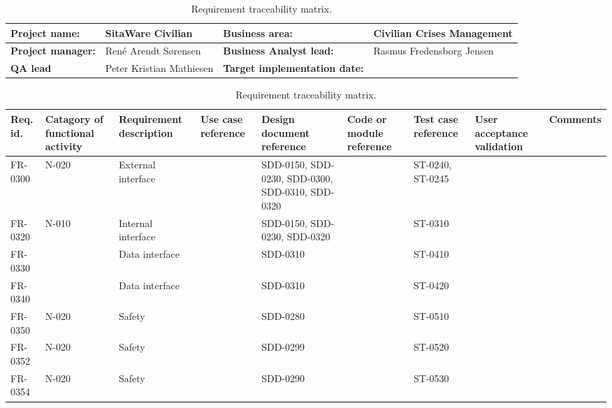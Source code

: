 \begin{sidewaystable}
\begin{table}[H]
\begin{tabular}{|l|l|l|l|}
\hline
 \textbf{Project name:} & SitaWare Civilian & \textbf{Business area:}  & Civilian Crises Management\\ \hline
 \textbf{Project manager:} & René Arendt Sørensen & \textbf{Business Analyst lead:} & Rasmus Fredensborg  Jensen\\ \hline
 \textbf{QA lead} & Peter Kristian Mathiesen & \textbf{Target implementation date:}  & \\ \hline
\end{tabular}	
\begin{tabular}{|p{2cm}|p{2cm}|p{3cm}|p{2cm}|p{2cm}|p{2cm}|p{2cm}|p{2cm}|p{2cm}|}
\hline
 Req. id. & Catagory of functional activity & Requirement description  & Use case reference & Design document reference & Code or module reference & Test case reference & User acceptance validation & Comments\\ \hline
 FR-0300 & N-020 & External interface & &SDD-0150, SDD-0230, SDD-0300, SDD-0310, SDD-0320& & ST-0240, ST-0245 & &\\ \hline
 FR-0320 & N-010 & Internal interface & &SDD-0150, SDD-0230, SDD-0320& & ST-0310 & &\\ \hline
 FR-0330 & & Data interface & &SDD-0310 & & ST-0410 & &\\ \hline
 FR-0340 & & Data interface & &SDD-0310 & & ST-0420 & &\\ \hline
 FR-0350 & N-020 & Safety & &SDD-0280 & & ST-0510 & &\\ \hline
 FR-0352 & N-020 & Safety & &SDD-0299 & & ST-0520 & &\\ \hline 
 FR-0354 & N-020 & Safety & &SDD-0290 & & ST-0530 & &\\ \hline

 
\end{tabular}	
\caption{Requirement traceability matrix.}
\end{table}

\end{sidewaystable}






